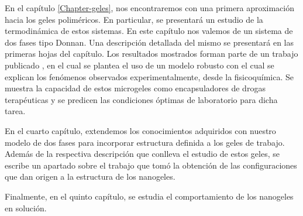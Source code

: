 En el cap\'itulo \ref{Chapter-geles}, nos encontraremos con una primera aproximaci\'on hacia los geles polim\'ericos. En particular, se presentará un estudio de la termodin\'amica de estos sistemas. En este cap\'itulo nos valemos de un sistema de dos fases tipo Donnan. Una descripci\'on detallada del mismo se presentar\'a en las primeras hojas del cap\'itulo. Los resultados mostrados forman parte de un trabajo publicado \cite{perez2021thermodynamic}, en el cual se plantea el uso de un modelo robusto con el cual se explican los fen\'omenos observados experimentalmente, desde la fisicoqu\'imica. Se muestra la capacidad de estos microgeles como encapsuladores de drogas terap\'euticas y se predicen las condiciones \'optimas de laboratorio para dicha tarea.

En el cuarto cap\'itulo, extendemos los conocimientos adquiridos con nuestro modelo de dos fases para incorporar estructura definida a los geles de trabajo. Adem\'as de la respectiva descripci\'on que conlleva el estudio de estos geles, se escribe un apartado sobre el trabajo que tom\'o la obtenci\'on de las configuraciones que dan origen a la estructura de los nanogeles.

Finalmente, en el quinto cap\'itulo, se estudia el comportamiento de los nanogeles en soluci\'on.





